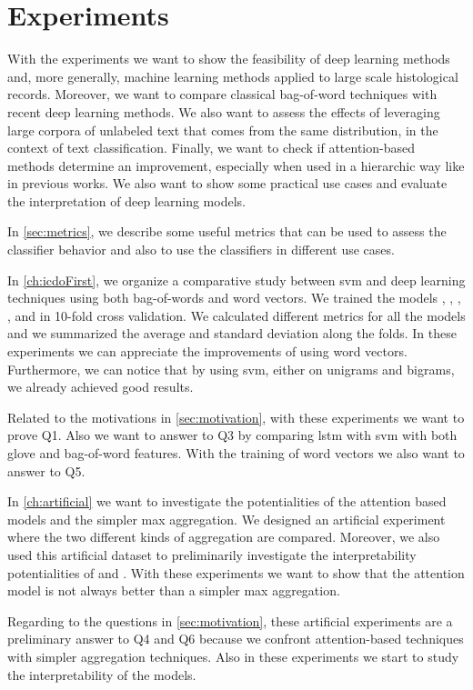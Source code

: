 \chapter{Experiments}
With the experiments we want to show the feasibility of deep learning
methods and, more generally, machine learning methods applied to large
scale histological records. Moreover, we want to compare classical
bag-of-word techniques with recent deep learning methods. We also want
to assess the effects of leveraging large corpora of unlabeled text
that comes from the same distribution, in the context of text
classification. Finally, we want to check if attention-based methods
determine an improvement, especially when used in a hierarchic way
like in
previous works. We also want to show some practical use cases and
evaluate the interpretation of deep learning models.

In \cref{sec:metrics}, we describe some useful metrics that can
be used to assess the 
classifier behavior and also to use the classifiers in different use
cases.

In \cref{ch:icdoFirst}, we organize a comparative study between
\ac{svm} and deep learning techniques using both bag-of-words and word
vectors. We trained the models \svm, \svmb, \lstmng, \lstmc, and
\lstmb in 10-fold cross validation. We calculated 
different metrics for all the models and we summarized the average and
standard deviation 
along the folds. In these
experiments we can appreciate the improvements of using word
vectors. Furthermore, we can notice that by using \ac{svm}, either on
unigrams and bigrams, we already achieved good results.

Related to the motivations in \cref{sec:motivation}, with these
experiments we want to prove Q1. Also we want to answer to Q3 by
comparing \ac{lstm} with
\ac{svm} with both \ac{glove} and bag-of-word features.  
With the training of word vectors we also want to answer to Q5.

In \cref{ch:artificial} we want to investigate the potentialities of
the attention based models and the simpler max aggregation. We
designed an artificial experiment where the two different
kinds of aggregation are compared. Moreover, we also used this artificial
dataset to preliminarily investigate the interpretability
potentialities of \maxi{} and \softmaxi{}. With these experiments we
want to show that the attention model is not always better than a
simpler max aggregation.

Regarding to the questions in \cref{sec:motivation}, these
artificial experiments are a preliminary answer to Q4 and Q6 because
we confront attention-based techniques with simpler aggregation
techniques. Also in these experiments we start to study the
interpretability of the models. 

